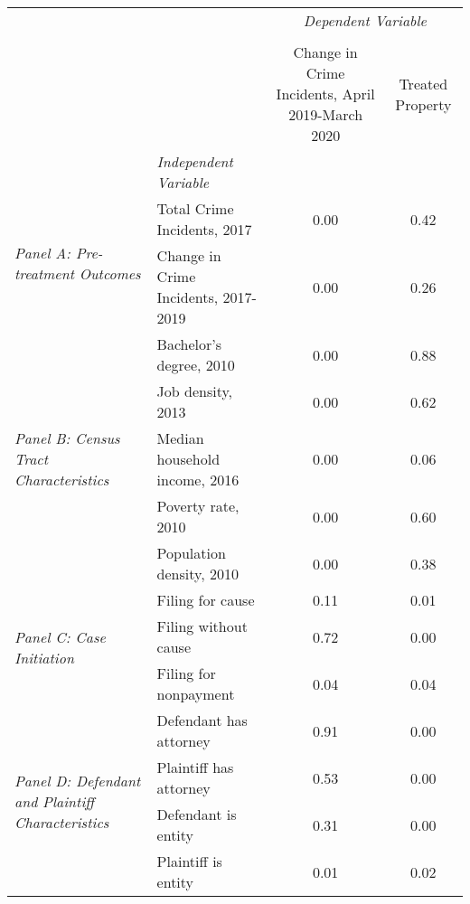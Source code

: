 \begin{tabular}{llcc}
\toprule
 &  & \multicolumn{2}{c}{\textit{Dependent Variable}} \\
\cline{3-4}
\\
 &  & Change in Crime Incidents, April 2019-March 2020 & Treated Property \\
 & \emph{Independent Variable} &  &  \\
\midrule
\multirow[c]{2}{3cm}{\textit{Panel A: Pre-treatment Outcomes}} & Total Crime Incidents, 2017 & 0.00 & 0.42 \\
 & Change in Crime Incidents, 2017-2019 & 0.00 & 0.26 \\
\cline{1-4}
\multirow[c]{5}{3cm}{\textit{Panel B: Census Tract Characteristics}} & Bachelor's degree, 2010 & 0.00 & 0.88 \\
 & Job density, 2013 & 0.00 & 0.62 \\
 & Median household income, 2016 & 0.00 & 0.06 \\
 & Poverty rate, 2010 & 0.00 & 0.60 \\
 & Population density, 2010 & 0.00 & 0.38 \\
\cline{1-4}
\multirow[c]{3}{3cm}{\textit{Panel C: Case Initiation}} & Filing for cause & 0.11 & 0.01 \\
 & Filing without cause & 0.72 & 0.00 \\
 & Filing for nonpayment & 0.04 & 0.04 \\
\cline{1-4}
\multirow[c]{4}{3cm}{\textit{Panel D: Defendant and Plaintiff Characteristics}} & Defendant has attorney & 0.91 & 0.00 \\
 & Plaintiff has attorney & 0.53 & 0.00 \\
 & Defendant is entity & 0.31 & 0.00 \\
 & Plaintiff is entity & 0.01 & 0.02 \\
\cline{1-4}
\bottomrule
\end{tabular}
